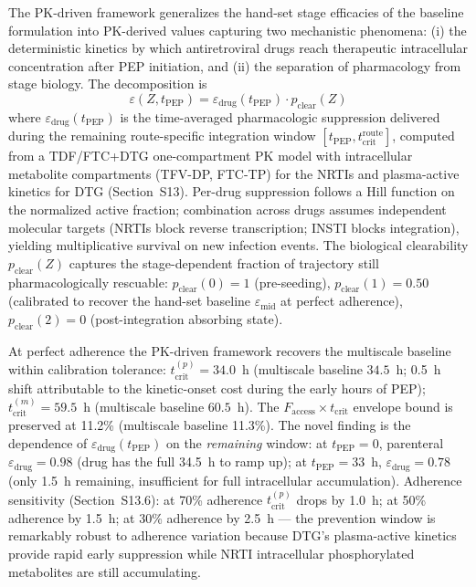 \documentclass[10pt,letterpaper]{article}
\theoremstyle{definition}
\theoremstyle{remark}
\newcommand{\Faccess}{F_{\text{access}}}
\newcommand{\tcrit}{t_{\text{crit}}}
\newcommand{\emid}{\varepsilon_{\text{mid}}}
\begin{document}
The PK-driven framework generalizes the hand-set stage efficacies of the baseline formulation into PK-derived values capturing two mechanistic phenomena: (i) the deterministic kinetics by which antiretroviral drugs reach therapeutic intracellular concentration after PEP initiation, and (ii) the separation of pharmacology from stage biology. The decomposition is
\begin{equation}
\varepsilon(Z, t_{\text{PEP}}) = \varepsilon_{\text{drug}}(t_{\text{PEP}}) \cdot p_{\text{clear}}(Z)
\label{eq:pk-driven}
\end{equation}
where $\varepsilon_{\text{drug}}(t_{\text{PEP}})$ is the time-averaged pharmacologic suppression delivered during the remaining route-specific integration window $[t_{\text{PEP}}, \tcrit^{\text{route}}]$, computed from a TDF/FTC+DTG one-compartment PK model with intracellular metabolite compartments (TFV-DP, FTC-TP) for the NRTIs and plasma-active kinetics for DTG (Section~S13). Per-drug suppression follows a Hill function on the normalized active fraction; combination across drugs assumes independent molecular targets (NRTIs block reverse transcription; INSTI blocks integration), yielding multiplicative survival on new infection events. The biological clearability $p_{\text{clear}}(Z)$ captures the stage-dependent fraction of trajectory still pharmacologically rescuable: $p_{\text{clear}}(0) = 1$ (pre-seeding), $p_{\text{clear}}(1) = 0.50$ (calibrated to recover the hand-set baseline $\emid$ at perfect adherence), $p_{\text{clear}}(2) = 0$ (post-integration absorbing state).

At perfect adherence the PK-driven framework recovers the multiscale baseline within calibration tolerance: $\tcrit^{(p)} = 34.0$~h (multiscale baseline $34.5$~h; 0.5~h shift attributable to the kinetic-onset cost during the early hours of PEP); $\tcrit^{(m)} = 59.5$~h (multiscale baseline $60.5$~h). The $\Faccess \times \tcrit$ envelope bound is preserved at 11.2\% (multiscale baseline 11.3\%). The novel finding is the dependence of $\varepsilon_{\text{drug}}(t_{\text{PEP}})$ on the \emph{remaining} window: at $t_{\text{PEP}} = 0$, parenteral $\varepsilon_{\text{drug}} = 0.98$ (drug has the full 34.5~h to ramp up); at $t_{\text{PEP}} = 33$~h, $\varepsilon_{\text{drug}} = 0.78$ (only 1.5~h remaining, insufficient for full intracellular accumulation). Adherence sensitivity (Section~S13.6): at 70\% adherence $\tcrit^{(p)}$ drops by 1.0~h; at 50\% adherence by 1.5~h; at 30\% adherence by 2.5~h --- the prevention window is remarkably robust to adherence variation because DTG's plasma-active kinetics provide rapid early suppression while NRTI intracellular phosphorylated metabolites are still accumulating.
\end{document}
